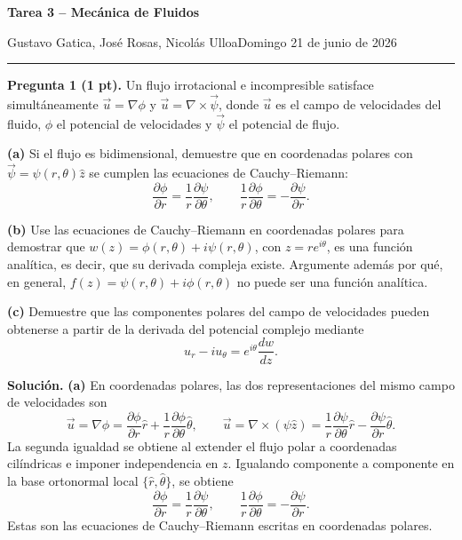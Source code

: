 \documentclass[11pt]{article}
\newcommand{\encabezado}[3]{%
{\Large\bfseries #1\par}
\vspace{2pt}
{\normalsize #2\hfill #3\par}
\vspace{6pt}\hrule\vspace{8pt}}
\newcommand{\inciso}[1]{\vspace{0.35em}\noindent\textbf{(#1)}\enspace}
\begin{document}
\encabezado{Tarea 3 -- Mecánica de Fluidos}{Gustavo Gatica, José Rosas, Nicolás Ulloa}{Domingo 21 de junio de 2026}

\noindent\textbf{Pregunta 1 (1 pt).} Un flujo irrotacional e incompresible satisface simultáneamente $\vec u=\nabla\phi$ y $\vec u=\nabla\times\vec\psi$, donde $\vec u$ es el campo de velocidades del fluido, $\phi$ el potencial de velocidades y $\vec\psi$ el potencial de flujo.

\textbf{(a)} Si el flujo es bidimensional, demuestre que en coordenadas polares con $\vec\psi=\psi(r,\theta)\hat z$ se cumplen las ecuaciones de Cauchy--Riemann:
\begin{equation}
\frac{\partial\phi}{\partial r}=\frac{1}{r}\frac{\partial\psi}{\partial\theta},
\qquad
\frac{1}{r}\frac{\partial\phi}{\partial\theta}=-\frac{\partial\psi}{\partial r}.
\label{eq:enun-cr-polares}
\end{equation}

\textbf{(b)} Use las ecuaciones de Cauchy--Riemann en coordenadas polares para demostrar que $w(z)=\phi(r,\theta)+i\psi(r,\theta)$, con $z=re^{i\theta}$, es una función analítica, es decir, que su derivada compleja existe. Argumente además por qué, en general, $f(z)=\psi(r,\theta)+i\phi(r,\theta)$ no puede ser una función analítica.

\textbf{(c)} Demuestre que las componentes polares del campo de velocidades pueden obtenerse a partir de la derivada del potencial complejo mediante
\begin{equation}
 u_r-iu_\theta=e^{i\theta}\frac{dw}{dz}.
\label{eq:enun-vel-polar}
\end{equation}

\noindent\textbf{Solución.}
\inciso{a} En coordenadas polares, las dos representaciones del mismo campo de velocidades son
\begin{equation}
\vec u=\nabla\phi=\frac{\partial\phi}{\partial r}\hat r+
\frac1r\frac{\partial\phi}{\partial\theta}\hat\theta,
\qquad
\vec u=\nabla\times(\psi\hat z)=\frac1r\frac{\partial\psi}{\partial\theta}\hat r-
\frac{\partial\psi}{\partial r}\hat\theta .
\label{eq:p1-campos}
\end{equation}
La segunda igualdad se obtiene al extender el flujo polar a coordenadas cilíndricas e imponer independencia en $z$. Igualando componente a componente en la base ortonormal local $\{\hat r,\hat\theta\}$, se obtiene
\begin{equation}
\frac{\partial\phi}{\partial r}=\frac1r\frac{\partial\psi}{\partial\theta},
\qquad
\frac1r\frac{\partial\phi}{\partial\theta}=-\frac{\partial\psi}{\partial r}.
\label{eq:cr-polares}
\end{equation}
Estas son las ecuaciones de Cauchy--Riemann escritas en coordenadas polares.
\end{document}
